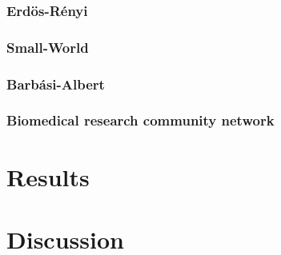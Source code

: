 \subsubsection{Erd\"{o}s-R\'enyi}

\subsubsection{Small-World}

\subsubsection{Barbási-Albert}

\subsubsection{Biomedical research community network}


\section{Results}
\label{sec:3}



\section{Discussion}
\label{sec:4}



